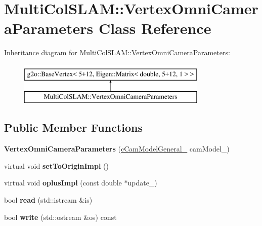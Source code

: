 \hypertarget{classMultiColSLAM_1_1VertexOmniCameraParameters}{}\section{Multi\+Col\+S\+L\+AM\+:\+:Vertex\+Omni\+Camera\+Parameters Class Reference}
\label{classMultiColSLAM_1_1VertexOmniCameraParameters}
Inheritance diagram for Multi\+Col\+S\+L\+AM\+:\+:Vertex\+Omni\+Camera\+Parameters\+:\begin{figure}[H]
\begin{center}
\leavevmode
\includegraphics[height=2.000000cm]{classMultiColSLAM_1_1VertexOmniCameraParameters}
\end{center}
\end{figure}
\subsection*{Public Member Functions}
\begin{DoxyCompactItemize}
\item 
{\bfseries Vertex\+Omni\+Camera\+Parameters} (\hyperlink{classMultiColSLAM_1_1cCamModelGeneral__}{c\+Cam\+Model\+General\+\_\+} cam\+Model\+\_\+)\hypertarget{classMultiColSLAM_1_1VertexOmniCameraParameters_a2e4df6c0e7e4b51ba79f5e166313c5e1}{}\label{classMultiColSLAM_1_1VertexOmniCameraParameters_a2e4df6c0e7e4b51ba79f5e166313c5e1}

\item 
virtual void {\bfseries set\+To\+Origin\+Impl} ()\hypertarget{classMultiColSLAM_1_1VertexOmniCameraParameters_a8a126f0ab5b2e6a9c693d19296614372}{}\label{classMultiColSLAM_1_1VertexOmniCameraParameters_a8a126f0ab5b2e6a9c693d19296614372}

\item 
virtual void {\bfseries oplus\+Impl} (const double $\ast$update\+\_\+)\hypertarget{classMultiColSLAM_1_1VertexOmniCameraParameters_a60f0efd28a7113d1b5e9942a35edb78e}{}\label{classMultiColSLAM_1_1VertexOmniCameraParameters_a60f0efd28a7113d1b5e9942a35edb78e}

\item 
bool {\bfseries read} (std\+::istream \&is)\hypertarget{classMultiColSLAM_1_1VertexOmniCameraParameters_a2be61ec77f8a6bcb88e34d586a97c1e9}{}\label{classMultiColSLAM_1_1VertexOmniCameraParameters_a2be61ec77f8a6bcb88e34d586a97c1e9}

\item 
bool {\bfseries write} (std\+::ostream \&os) const \hypertarget{classMultiColSLAM_1_1VertexOmniCameraParameters_ae9f5bbe1ed20c05a40f01cee7e598a66}{}\label{classMultiColSLAM_1_1VertexOmniCameraParameters_ae9f5bbe1ed20c05a40f01cee7e598a66}

\end{DoxyCompactItemize}
